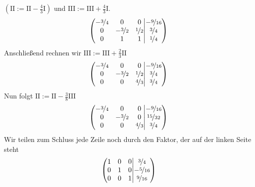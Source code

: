 \documentclass[11pt,a4paper,DIV=12]{scrartcl}
\begin{document}
$\left(\mathrm{II}:=\mathrm{II}-\frac{4}{3}\mathrm{I}\right)$ und $\mathrm{III}:=\mathrm{III}+\frac{4}{3}\mathrm{I}$.
%
%
%
\begin{gather}
	\left\lparen
	\begin{matrix}
		-\nicefrac{3}{4} & 0 & 0 \\
		0 & -\nicefrac{3}{2} & \nicefrac{1}{2} \\
		0 & 1 & 1
	\end{matrix}
	\middle\vert
	\begin{matrix}
		-\nicefrac{9}{16} \\
		\nicefrac{3}{4} \\
		\nicefrac{1}{4}
	\end{matrix}
	\right\rparen
\end{gather}
%
%
%
Anschließend rechnen wir $\mathrm{III}:=\mathrm{III}+\frac{2}{3}\mathrm{II}$
%
%
%
\begin{gather}
	\left\lparen
	\begin{matrix}
		-\nicefrac{3}{4} & 0 & 0 \\
		0 & -\nicefrac{3}{2} & \nicefrac{1}{2} \\
		0 & 0 & \nicefrac{4}{3}
	\end{matrix}
	\middle\vert
	\begin{matrix}
		-\nicefrac{9}{16} \\
		\nicefrac{3}{4} \\
		\nicefrac{3}{4}
	\end{matrix}
	\right\rparen
\end{gather}
%
%
%
Nun folgt $\mathrm{II}:=\mathrm{II}-\frac{3}{8}\mathrm{III}$
%
%
%
\begin{gather}
	\left\lparen
	\begin{matrix}
		-\nicefrac{3}{4} & 0 & 0 \\
		0 & -\nicefrac{3}{2} & 0 \\
		0 & 0 & \nicefrac{4}{3}
	\end{matrix}
	\middle\vert
	\begin{matrix}
		-\nicefrac{9}{16} \\
		\nicefrac{15}{32} \\
		\nicefrac{3}{4}
	\end{matrix}
	\right\rparen
\end{gather}
%
%
%
Wir teilen zum Schluss jede Zeile noch durch den Faktor, der auf 
der linken Seite steht
%
%
%
\begin{gather}
	\left\lparen
	\begin{matrix}
		1 & 0 & 0 \\
		0 & 1 & 0 \\
		0 & 0 & 1
	\end{matrix}
	\middle\vert
	\begin{matrix}
		\nicefrac{3}{4} \\
		-\nicefrac{5}{16} \\
		\nicefrac{9}{16}
	\end{matrix}
	\right\rparen
\end{gather}
\end{document}
